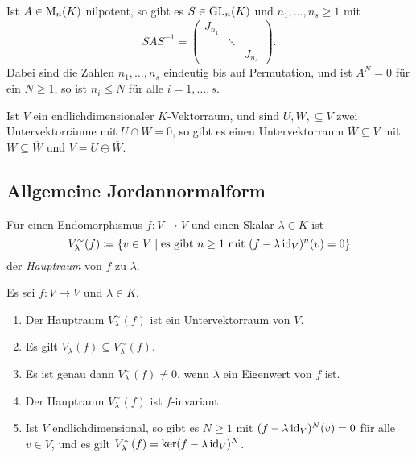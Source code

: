 \begin{corollary}
  Ist $A \in \mathrm{M}_n(K)$ nilpotent, so gibt es $S \in \mathrm{GL}_n(K)$ und $n_1, \dotsc, n_s \geq 1$ mit
  \[
    S A S^{-1}
    =
    \begin{pmatrix}
      J_{n_1} &         &         \\
              & \ddots  &         \\
              &         & J_{n_s}
    \end{pmatrix}.
  \]
  Dabei sind die Zahlen $n_1, \dotsc, n_s$ eindeutig bis auf Permutation, und ist $A^N = 0$ für ein $N \geq 1$, so ist $n_i \leq N$ für alle $i = 1, \dotsc, s$.
\end{corollary}


\begin{lemma}
  Ist $V$ ein endlichdimensionaler $K$-Vektorraum, und sind $U, W, \subseteq V$ zwei Untervektorräume mit $U \cap W = 0$, so gibt es einen Untervektorraum $\overline{W} \subseteq V$ mit $W \subseteq \overline{W}$ und $V = U \oplus \overline{W}$.
\end{lemma}










\subsection{Allgemeine Jordannormalform}


\begin{definition}
  Für einen Endomorphismus $f \colon V \to V$ und einen Skalar $\lambda \in K$ ist
  \[
    V^\sim_\lambda(f)
    \coloneqq
    \{
      v \in V
      \mid
      \text{es gibt $n \geq 1$ mit $(f - \lambda \operatorname{id}_V)^n(v) = 0$}
    \}
  \]
  der \emph{Hauptraum} von $f$ zu $\lambda$.
\end{definition}


\begin{lemma}
  Es sei $f \colon V \to V$ und $\lambda \in K$.
  \begin{enumerate}[leftmargin=*, label=\roman*)]
    \item
      Der Hauptraum $V^\sim_\lambda(f)$ ist ein Untervektorraum von $V$.
    \item
      Es gilt $V_\lambda(f) \subseteq V^\sim_\lambda(f)$.
    \item
      Es ist genau dann $V^\sim_\lambda(f) \neq 0$, wenn $\lambda$ ein Eigenwert von $f$ ist.
    \item
      Der Hauptraum $V^\sim_\lambda(f)$ ist $f$-invariant.
    \item
      Ist $V$ endlichdimensional, so gibt es $N \geq 1$ mit $(f - \lambda \operatorname{id}_V)^N(v) = 0$ für alle $v \in V$, und es gilt $V^\sim_\lambda(f) = \ker (f - \lambda \operatorname{id}_V)^N$.
  \end{enumerate}
\end{lemma}


